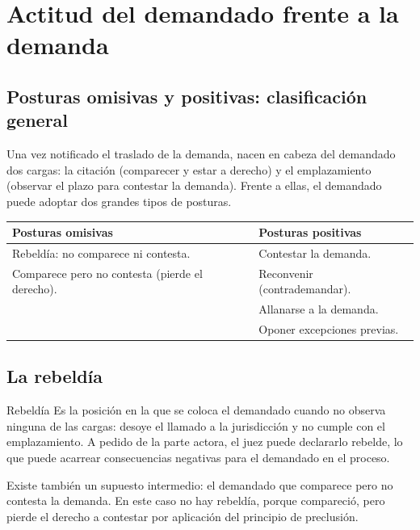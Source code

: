 \documentclass[12pt,oneside]{book}
\begin{document}
\chapter{Actitud del demandado frente a la demanda}

\section{Posturas omisivas y positivas: clasificación general}

Una vez notificado el traslado de la demanda, nacen en cabeza del demandado dos cargas: la citación (comparecer y estar a derecho) y el emplazamiento (observar el plazo para contestar la demanda). Frente a ellas, el demandado puede adoptar dos grandes tipos de posturas.

\begin{table}[H]
\centering
\begin{tabularx}{\textwidth}{X X}
\toprule
\textbf{Posturas omisivas} & \textbf{Posturas positivas} \\
\midrule
Rebeldía: no comparece ni contesta. &
Contestar la demanda. \\
Comparece pero no contesta (pierde el derecho). &
Reconvenir (contrademandar). \\
 & Allanarse a la demanda. \\
 & Oponer excepciones previas. \\
\bottomrule
\end{tabularx}
\end{table}

\section{La rebeldía}

\begin{definition}{Rebeldía}
Es la posición en la que se coloca el demandado cuando no observa ninguna de las cargas: desoye el llamado a la jurisdicción y no cumple con el emplazamiento. A pedido de la parte actora, el juez puede declararlo rebelde, lo que puede acarrear consecuencias negativas para el demandado en el proceso.
\end{definition}


Existe también un supuesto intermedio: el demandado que comparece pero no contesta la demanda. En este caso no hay rebeldía, porque compareció, pero pierde el derecho a contestar por aplicación del principio de preclusión.
\end{document}
